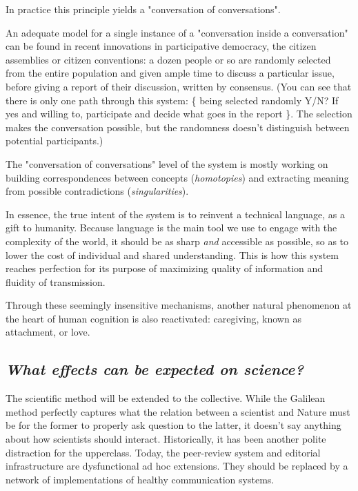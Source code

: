 \documentclass[11pt]{article}
\begin{document}
In practice this principle yields a "conversation of conversations".

An adequate model for a single instance of a "conversation inside a conversation" can be
found in recent innovations in participative democracy, the citizen assemblies or
citizen conventions: a dozen people or so are randomly selected from the entire
population and given ample time to discuss a particular issue, before giving a report of
their discussion, written by consensus. (You can see that there is only one path through
this system: \{ being selected randomly Y/N? If yes and willing to, participate and
decide what goes in the report \}. The selection makes the conversation possible, but
the randomness doesn't distinguish between potential participants.)

The "conversation of conversations" level of the system is mostly working on building
correspondences between concepts (\emph{homotopies}) and extracting meaning from
possible contradictions (\emph{singularities}).

In essence, the true intent of the system is to reinvent a technical language, as a gift
to humanity. Because language is the main tool we use to engage with the complexity of
the world, it should be as sharp \emph{and} accessible as possible, so as to lower the
cost of individual and shared understanding. This is how this system reaches perfection
for its purpose of maximizing quality of information and fluidity of transmission.

Through these seemingly insensitive mechanisms, another natural phenomenon at the heart
of human cognition is also reactivated: caregiving, known as attachment, or love.

\subsection*{\emph{What effects can be expected on science?}}

The scientific method will be extended to the collective. While the Galilean method
perfectly captures what the relation between a scientist and Nature must be for the
former to properly ask question to the latter, it doesn't say anything about how
scientists should interact. Historically, it has been another polite distraction for the
upperclass. Today, the peer-review system and editorial infrastructure are dysfunctional
ad hoc extensions. They should be replaced by a network of implementations of healthy
communication systems.
\end{document}
